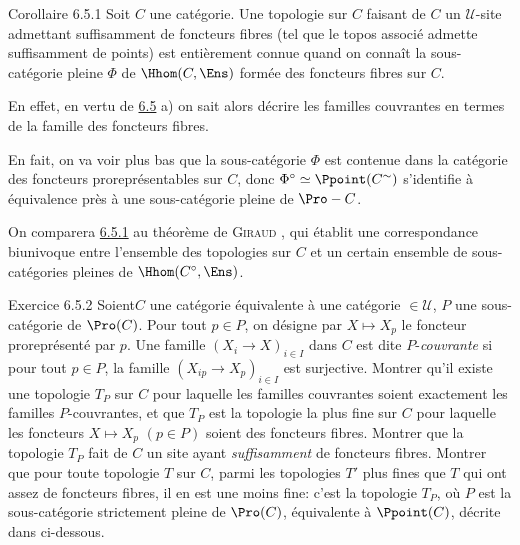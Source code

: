 \documentclass[10pt]{../fichiers-configuration-latex/smfart}
\begin{document}
\begin{enonce*}{Corollaire 6.5.1}
Soit $C$ une catégorie. Une topologie sur $C$ faisant de $C$ un
$𝒰$-site admettant suffisamment de foncteurs fibres (\ie tel
que le topos associé admette suffisamment de points) est entièrement
connue quand on connaît la sous-catégorie pleine $\Phi$ de
$\Hhom(C,\Ens)$ formée des foncteurs fibres sur $C$.
\end{enonce*}

En effet, en vertu de \hyperref[IV.prop6.5]{6.5} a) on sait alors décrire les
familles couvrantes en termes de la famille des foncteurs fibres.

En fait, on va voir plus bas  que la sous-catégorie
$\Phi$ est contenue dans la catégorie des foncteurs
proreprésentables sur $C$, donc $\Phi^{\circ}\simeq
\Ppoint(C^{\sim})$ s'identifie à équivalence près à une
sous-catégorie pleine de $\Pro-C$.

On comparera \hyperref[IV.cor6.5.1]{6.5.1} au théorème de \textsc{Giraud}
, qui établit une correspondance biunivoque entre
l'ensemble des topologies sur $C$ et un certain ensemble de
sous-catégories pleines de $\Hhom(C^{\circ},\Ens)$.

\begin{enonce*}[remark]{Exercice 6.5.2}
Soient\pageoriginale $C$ une catégorie équivalente à une catégorie
$\in 𝒰$, $P$ une sous-catégorie de $\Pro(C)$. Pour tout
$p\in P$, on désigne par $X\mapsto X_p$ le foncteur proreprésenté
par $p$. Une famille $(X_i\rightarrow X)_{i\in I}$ dans $C$ est dite
$P$-\emph{couvrante} si pour tout $p\in P$, la famille
$(X_{ip}\rightarrow X_p)_{i\in I}$ est surjective. Montrer qu'il
existe une topologie $T_P$ sur $C$ pour laquelle les familles
couvrantes soient exactement les familles $P$-couvrantes, et que
$T_P$ est la topologie la plus fine sur $C$ pour laquelle les
foncteurs $X\mapsto X_p$ $(p\in P)$ soient des foncteurs fibres.
Montrer que la topologie $T_P$ fait de $C$ un site ayant
\emph{suffisamment} de foncteurs fibres. Montrer que pour toute
topologie $T$ sur $C$, parmi les topologies $T'$ plus fines que $T$
qui ont assez de foncteurs fibres, il en est une moins fine: c'est
la topologie $T_P$, où $P$ est la sous-catégorie strictement pleine
de $\Pro(C)$, équivalente à $\Ppoint(C)$, décrite dans
ci-dessous.
\end{enonce*}
\end{document}
